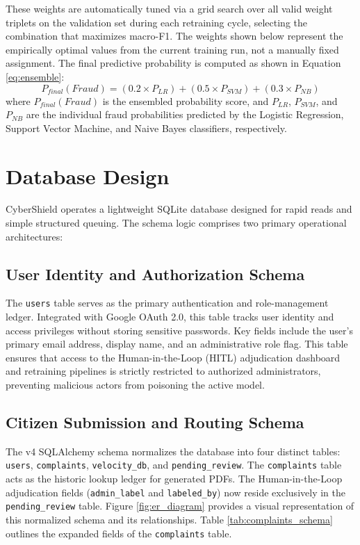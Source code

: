 These weights are automatically tuned via a grid search over all valid weight triplets on the validation set during each retraining cycle, selecting the combination that maximizes macro-F1. The weights shown below represent the empirically optimal values from the current training run, not a manually fixed assignment. The final predictive probability is computed as shown in Equation \ref{eq:ensemble}:
\begin{equation}
\label{eq:ensemble}
    P_{final}(Fraud) = (0.2 \times P_{LR}) + (0.5 \times P_{SVM}) + (0.3 \times P_{NB})
\end{equation}
where $P_{final}(Fraud)$ is the ensembled probability score, and $P_{LR}$, $P_{SVM}$, and $P_{NB}$ are the individual fraud probabilities predicted by the Logistic Regression, Support Vector Machine, and Naive Bayes classifiers, respectively.

\section{Database Design}
CyberShield operates a lightweight SQLite database designed for rapid reads and simple structured queuing.
The schema logic comprises two primary operational architectures:

\subsection{User Identity and Authorization Schema}
The \texttt{users} table serves as the primary authentication and role-management ledger. Integrated with Google OAuth 2.0, this table tracks user identity and access privileges without storing sensitive passwords. Key fields include the user's primary email address, display name, and an administrative role flag. This table ensures that access to the Human-in-the-Loop (HITL) adjudication dashboard and retraining pipelines is strictly restricted to authorized administrators, preventing malicious actors from poisoning the active model.

\subsection{Citizen Submission and Routing Schema}
The v4 SQLAlchemy schema normalizes the database into four distinct tables: \texttt{users}, \texttt{complaints}, \texttt{velocity\_db}, and \texttt{pending\_review}. The \texttt{complaints} table acts as the historic lookup ledger for generated PDFs. The Human-in-the-Loop adjudication fields (\texttt{admin\_label} and \texttt{labeled\_by}) now reside exclusively in the \texttt{pending\_review} table. Figure \ref{fig:er_diagram} provides a visual representation of this normalized schema and its relationships. Table \ref{tab:complaints_schema} outlines the expanded fields of the \texttt{complaints} table.

